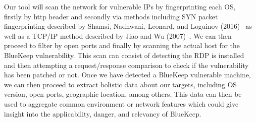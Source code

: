 Our tool will scan the network for vulnerable IPs by fingerprinting each OS, firstly by http header and secondly via methods including SYN packet fingerprinting described by Shamsi, Nadnwani, Leonard, and Loguinov (2016)~\cite{zain_ankur_derek_log_2014} as well as a TCP/IP method described by Jiao and Wu (2007)~\cite{jiao_wu_2007}. We can then proceed to filter by open ports and finally by scanning the actual host for the BlueKeep vulnerability. This scan can consist of detecting the RDP is installed and then  attempting a request/response comparison to check if the vulnerability has been patched or not. Once we have detected a BlueKeep vulnerable machine, we can then proceed to extract holistic data about our targets, including OS version, open ports, geographic location, among others. This data can then be used to aggregate common environment or network features which could give insight into the applicability, danger, and relevancy of BlueKeep.